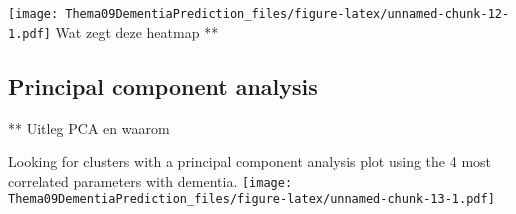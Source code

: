 \documentclass[
]{article}
\begin{document}
\texttt{[image: Thema09DementiaPrediction\_files/figure-latex/unnamed-chunk-12-1.pdf]}
Wat zegt deze heatmap **

\hypertarget{principal-component-analysis}{%
\subsection{Principal component
analysis}\label{principal-component-analysis}}

** Uitleg PCA en waarom

Looking for clusters with a principal component analysis plot using the
4 most correlated parameters with dementia.
\texttt{[image: Thema09DementiaPrediction\_files/figure-latex/unnamed-chunk-13-1.pdf]}
\end{document}
